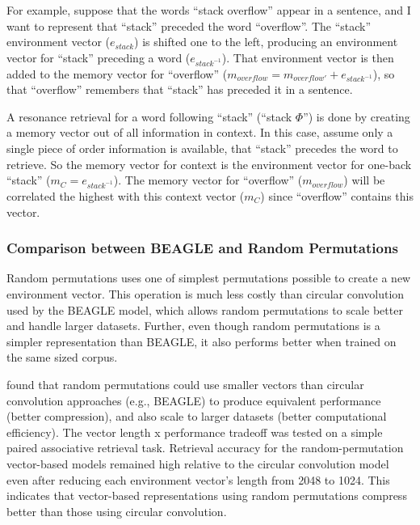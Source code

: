 \documentclass[man,floatsintext,donotrepeattitle]{apa6}
\begin{document}
For example, suppose that the words ``stack overflow'' appear in a sentence, and I want to represent that ``stack'' preceded the word ``overflow''.
The ``stack'' environment vector ($e_{stack}$) is shifted one to the left, producing an environment vector for ``stack'' preceding a word ($e_{stack^{-1}}$).
That environment vector is then added to the memory vector for ``overflow'' ($m_{overflow} = m_{overflow'} + e_{stack^{-1}}$), so that ``overflow'' remembers that ``stack'' has preceded it in a sentence.

A resonance retrieval for a word following ``stack'' (``stack $\Phi$'') is done by creating a memory vector out of all information in context.
In this case, assume only a single piece of order information is available, that ``stack'' precedes the word to retrieve.
So the memory vector for context is the environment vector for one-back ``stack'' ($m_{C} = e_{stack^{-1}}$).
The memory vector for ``overflow'' ($m_{overflow}$) will be correlated the highest with this context vector ($m_{C}$) since ``overflow'' contains this vector.

\subsubsection{Comparison between BEAGLE and Random Permutations}

Random permutations uses one of simplest permutations possible to create a new environment vector.
This operation is much less costly than circular convolution used by the BEAGLE model, which allows random permutations to scale better and handle larger datasets.
Further, even though random permutations is a simpler representation than BEAGLE, it also performs better when trained on the same sized corpus. 

\textcite{Recchia2010} found that random permutations could use smaller vectors than circular convolution approaches (e.g., BEAGLE) to produce equivalent performance (better compression),
and also scale to larger datasets (better computational efficiency).
The vector length x performance tradeoff was tested on a simple paired associative retrieval task. 
Retrieval accuracy for the random-permutation vector-based models remained high relative to the circular convolution model even after reducing each environment vector's length from \num{2048} to \num{1024}.
This indicates that vector-based representations using random permutations compress better than those using circular convolution.
\end{document}
